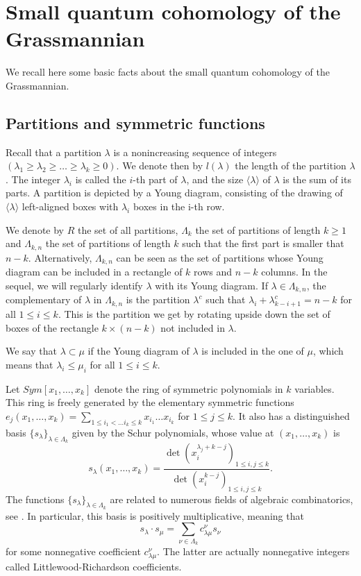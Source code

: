 \documentclass[10pt,11pt]{amsart}%
\begin{document}
\appendix
{}

\section{Small quantum cohomology of the Grassmannian}\label{sec:quantum_cohomology}
We recall here some basic facts about the small quantum cohomology of the Grassmannian.
\subsection{Partitions and symmetric functions}
Recall that a partition $\lambda$ is a nonincreasing sequence of integers $(\lambda_1\geq \lambda_2\geq \ldots\geq \lambda_k\geq 0)$. We denote then by $l(\lambda)$ the length of the partition $\lambda$. The integer $\lambda_i$ is called the $i$-th part of $\lambda$, and the size $\langle \lambda\rangle$ of $\lambda$ is the sum of its parts. A partition is depicted by a Young diagram, consisting of the drawing of $\langle \lambda\rangle$ left-aligned boxes with $\lambda_i$ boxes in the i-th row. 


We denote by $R$ the set of all partitions, $\Lambda_{k}$ the set of partitions of length $k\geq 1$ and $\Lambda_{k,n}$ the set of partitions of length $k$ such that the first part is smaller that $n-k$. Alternatively, $\Lambda_{k,n}$ can be seen as the set of partitions whose Young diagram can be included in a rectangle of $k$ rows and $n-k$ columns. In the sequel, we will regularly identify $\lambda$ with its Young diagram. If $\lambda\in \Lambda_{k,n}$, the  complementary of $\lambda$ in $\Lambda_{k,n}$ is the partition $\lambda^c$ such that $\lambda_i+\lambda^c_{k-i+1}=n-k$ for all $1\leq i\leq k$. This is the partition we get by rotating upside down the set of boxes of the rectangle $k\times (n-k)$ not included in $\lambda$.

We say that $\lambda\subset \mu$ if the Young diagram of $\lambda$ is included in the one of $\mu$, which means that $\lambda_i\leq \mu_i$ for all $1\leq i\leq k$. 

Let $Sym[x_1,\ldots,x_k]$ denote the ring of symmetric polynomials in $k$ variables. This ring is freely generated by the elementary symmetric functions $e_j(x_1,\ldots,x_k)=\sum_{1\leq i_1<\ldots i_k\leq k}x_{i_1}\dots x_{i_k}$ for $1\leq j\leq k$. It also has a distinguished basis $\{s_{\lambda}\}_{\lambda\in \Lambda_{k}}$ given by the Schur polynomials, whose value at $(x_1,\ldots,x_k)$ is 
$$s_{\lambda}(x_1,\ldots,x_k)=\frac{\det(x_i^{\lambda_j+k-j})_{1\leq i,j\leq k}}{\det(x_i^{k-j})_{1\leq i,j\leq k}}.$$
The functions $\{s_{\lambda}\}_{\lambda\in \Lambda_{k}}$ are related to numerous fields of algebraic combinatorics, see \cite{Fulton1997}. In particular, this basis is positively multiplicative, meaning that 
$$s_{\lambda}\cdot s_{\mu}=\sum_{\nu\in \Lambda_{k}}c_{\lambda \mu}^\nu s_{\nu}$$
for some nonnegative coefficient $c_{\lambda\mu}^\nu$. The latter are actually nonnegative integers called Littlewood-Richardson coefficients.
\end{document}
